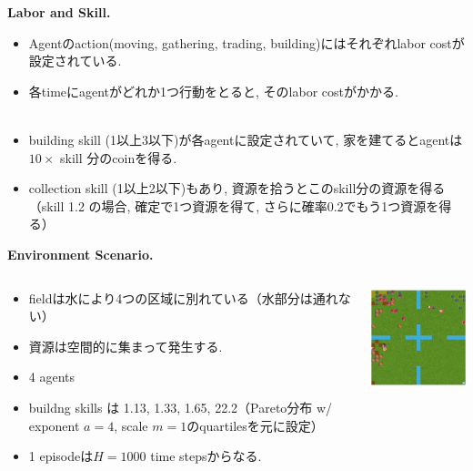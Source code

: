 \documentclass[unicode,aspectratio=169,11pt]{beamer}
\begin{document}
\begin{frame}{}{}
{\bf Labor and Skill.}
\begin{itemize}
    \item Agentのaction(moving, gathering, trading, building)にはそれぞれlabor costが設定されている.
    \item 各timeにagentがどれか1つ行動をとると, そのlabor costがかかる.\\
    　
    \item building skill (1以上3以下)が各agentに設定されていて, 家を建てるとagentは $10 \times$ skill 分のcoinを得る.
    \item collection skill (1以上2以下)もあり, 資源を拾うとこのskill分の資源を得る\\
          （skill 1.2 の場合, 確定で1つ資源を得て, さらに確率0.2でもう1つ資源を得る）
\end{itemize}
\end{frame}

\begin{frame}{}{}
{\bf Environment Scenario.}
\begin{columns}[t]
    \begin{column}{0.6\textwidth}
        \begin{itemize}
            \item fieldは水により4つの区域に別れている（水部分は通れない）
            \item 資源は空間的に集まって発生する.
            \item 4 agents
            \item buildng skills は 1.13, 1.33, 1.65, 22.2（Pareto分布 w/ exponent $a=4$, scale $m=1$のquartilesを元に設定）
            \item 1 episodeは$H = 1000$ time stepsからなる.
        \end{itemize}
    \end{column}
    \begin{column}{0.4\textwidth}
        \begin{center}
            \includegraphics[width=5cm]{figure1.png}
        \end{center}
    \end{column}
\end{columns}
\end{frame}
\end{document}
